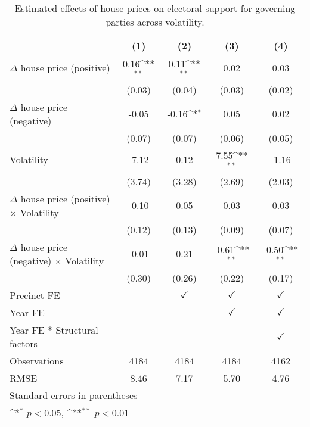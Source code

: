 \begin{table}[htbp]\centering
\def\sym#1{\ifmmode^{#1}\else\(^{#1}\)\fi}
\caption{Estimated effects of house prices on electoral support for governing parties across volatility.} \label{tab6}
\begin{tabular}{l*{4}{c}}
\hline\hline
                    &\multicolumn{1}{c}{(1)}        &\multicolumn{1}{c}{(2)}        &\multicolumn{1}{c}{(3)}        &\multicolumn{1}{c}{(4)}        \\
\hline
$\Delta$ house price (positive)&        0.16\sym{**}&        0.11\sym{**}&        0.02        &        0.03        \\
                    &      (0.03)        &      (0.04)        &      (0.03)        &      (0.02)        \\
[1em]
$\Delta$ house price (negative)&       -0.05        &       -0.16\sym{*} &        0.05        &        0.02        \\
                    &      (0.07)        &      (0.07)        &      (0.06)        &      (0.05)        \\
[1em]
Volatility          &       -7.12        &        0.12        &        7.55\sym{**}&       -1.16        \\
                    &      (3.74)        &      (3.28)        &      (2.69)        &      (2.03)        \\
[1em]
$\Delta$ house price (positive) $\times$ Volatility&       -0.10        &        0.05        &        0.03        &        0.03        \\
                    &      (0.12)        &      (0.13)        &      (0.09)        &      (0.07)        \\
[1em]
$\Delta$ house price (negative) $\times$ Volatility&       -0.01        &        0.21        &       -0.61\sym{**}&       -0.50\sym{**}\\
                    &      (0.30)        &      (0.26)        &      (0.22)        &      (0.17)        \\
[1em]
\hline Precinct FE  &                    &$\checkmark$        &$\checkmark$        &$\checkmark$        \\
[1em]
Year FE             &                    &                    &$\checkmark$        &$\checkmark$        \\
[1em]
Year FE * Structural factors&                    &                    &                    &$\checkmark$        \\
\hline
Observations        &        4184        &        4184        &        4184        &        4162        \\
RMSE                &        8.46        &        7.17        &        5.70        &        4.76        \\
\hline\hline
\multicolumn{5}{l}{\footnotesize Standard errors in parentheses}\\
\multicolumn{5}{l}{\footnotesize \sym{*} \(p<0.05\), \sym{**} \(p<0.01\)}\\
\end{tabular}
\end{table}
